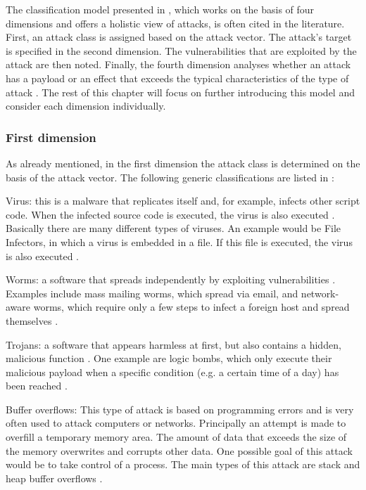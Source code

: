 \documentclass[conference]{IEEEtran}
\begin{document}
\medskip The classification model presented in \cite{b5}, which works on the basis of four dimensions and offers a holistic view of attacks, is often cited in the literature. First, an attack class is assigned based on the attack vector. The attack's target is specified in the second dimension. The vulnerabilities that are exploited by the attack are then noted. Finally, the fourth dimension analyses whether an attack has a payload or an effect that exceeds the typical characteristics of the type of attack \cite{b5} . The rest of this chapter will focus on further introducing this model and consider each dimension individually.

\subsubsection{First dimension}

\medskip As already mentioned, in the first dimension the attack class is determined on the basis of the attack vector. The following generic classifications are listed in \cite{b5}:

\smallskip Virus: this is a malware that replicates itself and, for example, infects other script code. When the infected source code is executed, the virus is also executed \cite{b6}.  Basically there are many different types of viruses. An example would be File Infectors, in which a virus is embedded in a file. If this file is executed, the virus is also executed \cite{b2}.

\smallskip Worms: a software that spreads independently by exploiting vulnerabilities \cite{b6}. Examples include mass mailing worms, which spread via email, and network-aware worms, which require only a few steps to infect a foreign host and spread themselves \cite{b2}.

\smallskip Trojans: a software that appears harmless at first, but also contains a hidden, malicious function \cite{b6}. One example are logic bombs, which only execute their malicious payload when a specific condition (e.g. a certain time of a day) has been reached \cite{b2}.

\smallskip Buffer overflows: This type of attack is based on programming errors and is very often used to attack computers or networks. Principally an attempt is made to overfill a temporary memory area. The amount of data that exceeds the size of the memory overwrites and corrupts other data. One possible goal of this attack would be to take control of a process. The main types of this attack are stack and heap buffer overflows \cite{b2}.
\end{document}
